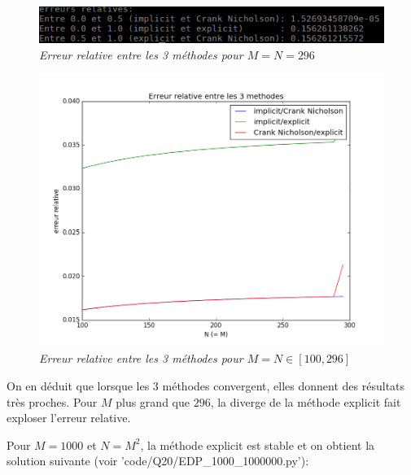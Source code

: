 \documentclass[10pt]{article}
\begin{document}
  \begin{figure}[H]
    \begin{center}
      \includegraphics[width=12cm,keepaspectratio]{./images/erreurs_296_296.png}
    \end{center}
    \caption{\textit{Erreur relative entre les 3 méthodes pour $M=N=296$}}
    \label{erreurs_296_296}
  \end{figure}
  
  \begin{figure}[H]
    \begin{center}
      \includegraphics[width=12cm,keepaspectratio]{./images/edp_err.png}
    \end{center}
    \caption{\textit{Erreur relative entre les 3 méthodes pour $M=N \in [100, 296]$}}
    \label{edp_err}
  \end{figure}
  
  On en déduit que lorsque les 3 méthodes convergent, elles donnent des résultats très proches.
  Pour $M$ plus grand que $296$, la diverge de la méthode explicit fait exploser l'erreur relative.
  
  \newpage
  Pour $M = 1000$ et $N=M^2$, la méthode explicit est stable et on obtient la solution suivante (voir 'code/Q20/EDP\_1000\_1000000.py'):
  
\end{document}
